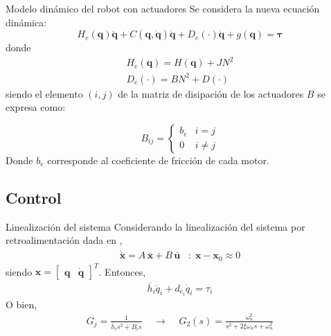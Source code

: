 \begin{frame}{Modelo dinámico del robot con actuadores}
    Se considera la nueva ecuación dinámica:
    \begin{equation}
        H_e(\boldsymbol{q})\boldsymbol{\ddot{q}} + C(\boldsymbol{q}, \boldsymbol{\dot{q}})\boldsymbol{\dot{q}}  + D_e(\cdot)\boldsymbol{\dot{q}} + g(\boldsymbol{q}) = \boldsymbol{\tau}
    \end{equation}
    donde
    \begin{align}
        H_e(\boldsymbol{q}) = H(\boldsymbol{q}) + J N^2 \\
        D_e(\cdot) = B N^2 + D(\cdot)
    \end{align}
    siendo el elemento $(i,j)$ de la matriz de disipación de los actuadores 
    $B$ se expresa como:

    \begin{equation}
        B_{ij} = 
        \begin{cases}
            b_e & i = j \\
            0 & i \neq j
        \end{cases}
    \end{equation}
    Donde $b_e$ corresponde al coeficiente de fricción de cada motor.

\end{frame}

\subsection{Control}
\begin{frame}{Linealización del sistema}
    Considerando la linealización del sistema por retroalimentación dada en \cite{spong_hutchinson_vidyasagar_2020},
    \begin{align}
        \boldsymbol{\dot{\overline{x}}} = A \, \boldsymbol{\overline{x}} + B \, \boldsymbol{\overline{u}} \;\;\; : \; \boldsymbol{x} -\boldsymbol{x}_0 \approx 0
    \end{align}
    siendo $\boldsymbol{x} = \begin{bmatrix} \boldsymbol{q} &  \boldsymbol{\dot{q}} \end{bmatrix}^T$. Entonces, 
    \begin{align}
        \overline{h}_{i} \ddot{q}_{i} + d_{e_i} \dot{q}_i = \tau_i 
        \label{eqn:modelo_joint}
    \end{align}
    O bien, 
    \begin{align}
        \label{eqn:joint_tf}
        G_j = \frac{1}{\overline{h}_{i} s^2 + B_i s} \;\;\;\; \to \;\;\;\;
        G_{2}(s) = \frac{\omega_n^2}{s^2 + 2 \xi \omega_n s + \omega_n^2}
    \end{align}
\end{frame}

